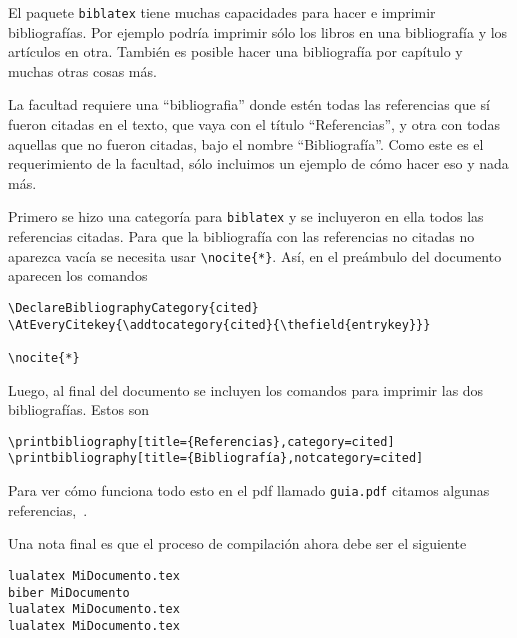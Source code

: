 El paquete \texttt{biblatex} tiene muchas capacidades para hacer e imprimir 
bibliografías. Por ejemplo podría imprimir sólo los libros en una bibliografía 
y los artículos en otra. También es posible hacer una bibliografía por capítulo 
y muchas otras cosas más.

La facultad requiere una \enquote{bibliografia} donde estén todas las 
referencias que sí fueron citadas en el texto, que vaya con el título 
\enquote{Referencias}, y otra con todas aquellas que no fueron citadas, bajo el 
nombre \enquote{Bibliografía}. Como este es el requerimiento de la facultad, 
sólo incluimos un ejemplo de cómo hacer eso y nada más.

Primero se hizo una categoría para \texttt{biblatex} y se incluyeron en ella todos las referencias citadas. Para que la bibliografía con las referencias no citadas no aparezca vacía se necesita usar \verb|\nocite{*}|. Así, en el preámbulo del documento aparecen los comandos
\begin{verbatim}
\DeclareBibliographyCategory{cited}
\AtEveryCitekey{\addtocategory{cited}{\thefield{entrykey}}}

\nocite{*}
\end{verbatim}
Luego, al final del documento se incluyen los comandos para imprimir las dos bibliografías. Estos son
\begin{verbatim}
\printbibliography[title={Referencias},category=cited]
\printbibliography[title={Bibliografía},notcategory=cited]
\end{verbatim}

Para ver cómo funciona todo esto en el pdf llamado \texttt{guia.pdf} citamos algunas referencias,~\cite{ACohesion,Homotopy,ToposT,CWM}.

Una nota final es que el proceso de compilación ahora debe ser el siguiente
\begin{flushleft}
\verb|lualatex MiDocumento.tex|\\
\verb|biber MiDocumento|\\
\verb|lualatex MiDocumento.tex|\\
\verb|lualatex MiDocumento.tex|
\end{flushleft}
